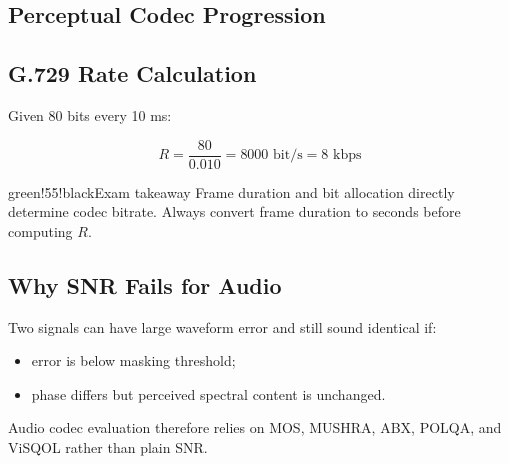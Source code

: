 \subsection{Perceptual Codec Progression}

\begin{center}
\end{center}

\subsection{G.729 Rate Calculation}

Given 80 bits every 10 ms:

\[
R=\frac{80}{0.010}=8000\text{ bit/s}=8\text{ kbps}
\]

\begin{calloutbox}{green!55!black}{Exam takeaway}
Frame duration and bit allocation directly determine codec bitrate. Always convert frame duration to seconds before computing $R$.
\end{calloutbox}

\subsection{Why SNR Fails for Audio}

Two signals can have large waveform error and still sound identical if:

\begin{itemize}
  \item error is below masking threshold;
  \item phase differs but perceived spectral content is unchanged.
\end{itemize}

Audio codec evaluation therefore relies on MOS, MUSHRA, ABX, POLQA, and ViSQOL rather than plain SNR.

